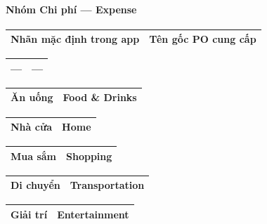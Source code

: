 \paragraph{Nhóm Chi phí — Expense}

\begin{table}[htbp]
\centering
\begin{tabularx}{\textwidth}{|l|X|}
\hline
Nhãn mặc định trong app & Tên gốc PO cung cấp \\ \hline
\end{tabularx}
\end{table}

\begin{table}[htbp]
\centering
\begin{tabularx}{\textwidth}{|l|X|}
\hline
--- & --- \\ \hline
\end{tabularx}
\end{table}

\begin{table}[htbp]
\centering
\begin{tabularx}{\textwidth}{|l|X|}
\hline
Ăn uống & Food \& Drinks \\ \hline
\end{tabularx}
\end{table}

\begin{table}[htbp]
\centering
\begin{tabularx}{\textwidth}{|l|X|}
\hline
Nhà cửa & Home \\ \hline
\end{tabularx}
\end{table}

\begin{table}[htbp]
\centering
\begin{tabularx}{\textwidth}{|l|X|}
\hline
Mua sắm & Shopping \\ \hline
\end{tabularx}
\end{table}

\begin{table}[htbp]
\centering
\begin{tabularx}{\textwidth}{|l|X|}
\hline
Di chuyển & Transportation \\ \hline
\end{tabularx}
\end{table}

\begin{table}[htbp]
\centering
\begin{tabularx}{\textwidth}{|l|X|}
\hline
Giải trí & Entertainment \\ \hline
\end{tabularx}
\end{table}

